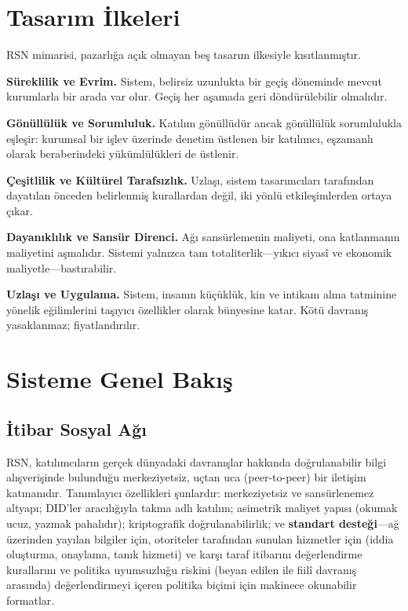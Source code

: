 \documentclass[11pt,a4paper,twocolumn]{article}
\begin{document}
\section{Tasarım İlkeleri}

RSN mimarisi, pazarlığa açık olmayan beş tasarım ilkesiyle kısıtlanmıştır.

\textbf{Süreklilik ve Evrim.} Sistem, belirsiz uzunlukta bir geçiş döneminde mevcut kurumlarla bir arada var olur. Geçiş her aşamada geri döndürülebilir olmalıdır.

\textbf{Gönüllülük ve Sorumluluk.} Katılım gönüllüdür ancak gönüllülük sorumlulukla eşleşir: kurumsal bir işlev üzerinde denetim üstlenen bir katılımcı, eşzamanlı olarak beraberindeki yükümlülükleri de üstlenir.

\textbf{Çeşitlilik ve Kültürel Tarafsızlık.} Uzlaşı, sistem tasarımcıları tarafından dayatılan önceden belirlenmiş kurallardan değil, iki yönlü etkileşimlerden ortaya çıkar.

\textbf{Dayanıklılık ve Sansür Direnci.} Ağı sansürlemenin maliyeti, ona katlanmanın maliyetini aşmalıdır. Sistemi yalnızca tam totaliterlik---yıkıcı siyasî ve ekonomik maliyetle---bastırabilir.

\textbf{Uzlaşı ve Uygulama.} Sistem, insanın küçüklük, kin ve intikam alma tatminine yönelik eğilimlerini taşıyıcı özellikler olarak bünyesine katar. Kötü davranış yasaklanmaz; fiyatlandırılır.

\section{Sisteme Genel Bakış}

\subsection{İtibar Sosyal Ağı}

RSN, katılımcıların gerçek dünyadaki davranışlar hakkında doğrulanabilir bilgi alışverişinde bulunduğu merkeziyetsiz, uçtan uca (peer-to-peer) bir iletişim katmanıdır. Tanımlayıcı özellikleri şunlardır: merkeziyetsiz ve sansürlenemez altyapı; DID'ler aracılığıyla takma adlı katılım; asimetrik maliyet yapısı (okumak ucuz, yazmak pahalıdır); kriptografik doğrulanabilirlik; ve \textbf{standart desteği}---ağ üzerinden yayılan bilgiler için, otoriteler tarafından sunulan hizmetler için (iddia oluşturma, onaylama, tanık hizmeti) ve karşı taraf itibarını değerlendirme kurallarını ve politika uyumsuzluğu riskini (beyan edilen ile fiilî davranış arasında) değerlendirmeyi içeren politika biçimi için makinece okunabilir formatlar.
\end{document}
